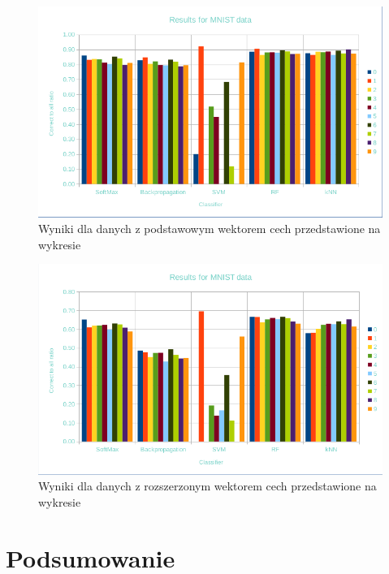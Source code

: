 \documentclass{article}
\begin{document}
\begin{figure}[htp]
	\centering
	\includegraphics[width=1\textwidth]{Figures/basic-vector-summary.png}
	\caption{ Wyniki dla danych z podstawowym wektorem cech przedstawione na wykresie }
	\label{fig:basic-vector-summary}\vspace{-3pt}
\end{figure}

\begin{figure}[htp]
\centering
\includegraphics[width=1\textwidth]{Figures/extended-vector-summary.png}
\caption{ Wyniki dla danych z rozszerzonym wektorem cech przedstawione na wykresie }
\label{fig:extended-vector-summary}\vspace{-3pt}
\end{figure}

\section{Podsumowanie}
\end{document}
